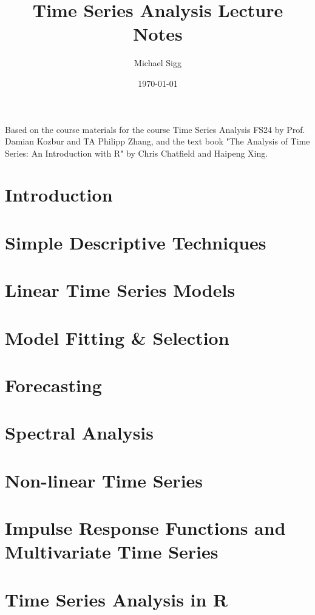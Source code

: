 \documentclass[11pt]{article}
\title{Time Series Analysis Lecture Notes}
\author{Michael Sigg}
\date{\today}
\begin{document}
\maketitle
\begin{center}
    Based on the course materials for the course Time Series Analysis FS24 by Prof. Damian Kozbur and TA Philipp Zhang, and the text book "The Analysis of Time Series: An Introduction with R" by Chris Chatfield and Haipeng Xing.
\end{center}
\tableofcontents

\newpage

\section{Introduction}


\section{Simple Descriptive Techniques}


\section{Linear Time Series Models}


\section{Model Fitting \& Selection}


\section{Forecasting}


\section{Spectral Analysis}


\section{Non-linear Time Series}


\section{Impulse Response Functions and Multivariate Time Series}


\newpage
\section{Time Series Analysis in R}

\end{document}
